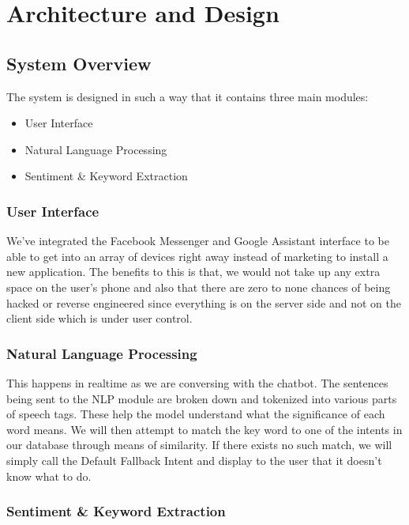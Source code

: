 \chapter{Architecture and Design}

\pagebreak

\section{System Overview}

The system is designed in such a way that it contains three main modules:
\begin{itemize}
    \item User Interface
    \item Natural Language Processing
    \item Sentiment \& Keyword Extraction
\end{itemize}

\subsection{User Interface}

We’ve integrated the Facebook Messenger and Google Assistant interface to be able to get into an array of devices right away instead of marketing to install a new application. The benefits to this is that, we would not take up any extra space on the user’s phone and also that there are zero to none chances of being hacked or reverse engineered since everything is on the server side and not on the client side which is under user control.

\subsection{Natural Language Processing}

This happens in realtime as we are conversing with the chatbot. The sentences being sent to the NLP module are broken down and tokenized into various parts of speech tags. These help the model understand what the significance of each word means. We will then attempt to match the key word to one of the intents in our database through means of similarity. If there exists no such match, we will simply call the Default Fallback Intent and display to the user that it doesn’t know what to do.

\subsection{Sentiment \& Keyword Extraction}

